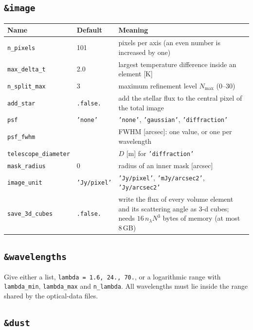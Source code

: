 \documentclass[11pt,a4paper]{article}
\newcommand{\code}[1]{\texttt{#1}}
\begin{document}
\subsection{\code{\&image}}

\small
\begin{longtable}{@{}R{4.15cm}R{3.4cm}R{7.45cm}@{}}
\toprule
Name & Default & Meaning \\
\midrule
\endhead
\code{n\_pixels} & 101 & pixels per axis (an even number is increased by one) \\
\code{max\_delta\_t} & 2.0 & largest temperature difference inside an element [K] \\
\code{n\_split\_max} & 3 & maximum refinement level $N_\mathrm{max}$ (0--30) \\
\code{add\_star} & \code{.false.} & add the stellar flux to the central pixel of the total image \\
\code{psf} & \code{'none'} & \code{'none'}, \code{'gaussian'}, \code{'diffraction'} \\
\code{psf\_fwhm} & & FWHM [arcsec]: one value, or one per wavelength \\
\code{telescope\_diameter} & & $D$ [m] for \code{'diffraction'} \\
\code{mask\_radius} & 0 & radius of an inner mask [arcsec] \\
\code{image\_unit} & \code{'Jy/pixel'} & \code{'Jy/pixel'}, \code{'mJy/arcsec2'},
  \code{'Jy/arcsec2'} \\
\code{save\_3d\_cubes} & \code{.false.} & write the flux of every volume element and its
  scattering angle as 3-d cubes; needs $16\,n_\lambda N^3$ bytes of memory (at most 8\,GB) \\
\bottomrule
\end{longtable}
\normalsize

\subsection{\code{\&wavelengths}}

Give either a list, \code{lambda = 1.6, 24., 70.}, or a logarithmic range with
\code{lambda\_min}, \code{lambda\_max} and \code{n\_lambda}. All wavelengths must lie inside
the range shared by the optical-data files.

\subsection{\code{\&dust}}
\end{document}
